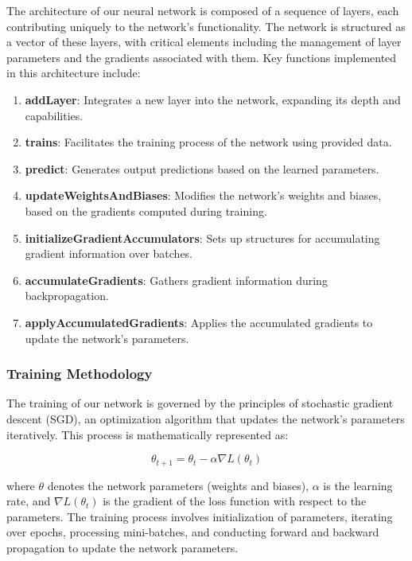 \documentclass{article}
\begin{document}
The architecture of our neural network is composed of a sequence of layers, each contributing uniquely to the network's functionality. The network is structured as a vector of these layers, with critical elements including the management of layer parameters and the gradients associated with them. Key functions implemented in this architecture include:

\begin{enumerate}
    \item \textbf{addLayer}: Integrates a new layer into the network, expanding its depth and capabilities.
    \item \textbf{trains}: Facilitates the training process of the network using provided data.
    \item \textbf{predict}: Generates output predictions based on the learned parameters.
    \item \textbf{updateWeightsAndBiases}: Modifies the network's weights and biases, based on the gradients computed during training.
    \item \textbf{initializeGradientAccumulators}: Sets up structures for accumulating gradient information over batches.
    \item \textbf{accumulateGradients}: Gathers gradient information during backpropagation.
    \item \textbf{applyAccumulatedGradients}: Applies the accumulated gradients to update the network's parameters.
\end{enumerate}

\subsubsection{Training Methodology}

The training of our network is governed by the principles of stochastic gradient descent (SGD), an optimization algorithm that updates the network's parameters iteratively. This process is mathematically represented as:

\begin{equation}
    \theta_{t+1} = \theta_t - \alpha \nabla L(\theta_t)
\end{equation}

where \( \theta \) denotes the network parameters (weights and biases), \( \alpha \) is the learning rate, and \( \nabla L(\theta_t) \) is the gradient of the loss function with respect to the parameters. The training process involves initialization of parameters, iterating over epochs, processing mini-batches, and conducting forward and backward propagation to update the network parameters.
\end{document}

